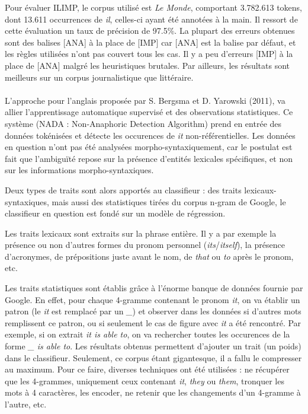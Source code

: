 \documentclass[a4paper,12pt]{article}
\begin{document}
Pour évaluer ILIMP, le corpus utilisé est \emph{Le Monde}, comportant 3.782.613 tokens, dont 13.611 occurrences de \og{}\textit{il}\fg{}, celles-ci ayant été annotées à la main. Il ressort de cette évaluation un taux de précision de 97.5\%. La plupart des erreurs obtenues sont des balises [ANA] à la place de [IMP] car [ANA] est la balise par défaut, et les règles utilisées n'ont pas couvert tous les cas. Il y a peu d'erreurs [IMP] à la place de [ANA] malgré les heuristiques brutales.
Par ailleurs, les résultats sont meilleurs sur un corpus journalistique que littéraire.


\paragraph{}
L'approche pour l'anglais proposée par S. Bergsma et D. Yarowski (2011), va allier l'apprentissage automatique supervisé et des observations statistiques.
Ce système (NADA : Non-Anaphoric Detection Algorithm) prend en entrée des données tokénisées et détecte les occurences de \og{}\textit{it}\fg{} non-référentielles. Les données en question n'ont pas été analysées morpho-syntaxiquement, car le postulat est fait que l'ambiguïté repose sur la présence d'entités lexicales spécifiques, et non sur les informations morpho-syntaxiques.

Deux types de traits sont alors apportés au classifieur : des traits lexicaux-syntaxiques, mais aussi des statistiques tirées du corpus n-gram de Google\cite{google-ngram}, le classifieur en question est fondé sur un modèle de régression.

Les traits lexicaux sont extraits sur la phrase entière. Il y a par exemple la présence ou non d'autres formes du pronom personnel (\textit{its}/\textit{itself}), la présence d'acronymes, de prépositions juste avant le nom, de \og{}\textit{that}\fg{} ou \og{}\textit{to}\fg{} après le pronom, etc.

Les traits statistiques sont établis grâce à l'énorme banque de données fournie par Google. En effet, pour chaque 4-gramme contenant le pronom \og{}\textit{it}\fg{}, on va établir un patron (le \og{}\textit{it}\fg{} est remplacé par un \og{}\textit{\_}\fg{}) et observer dans les données si d'autres mots remplissent ce patron, ou si seulement le cas de figure avec \og{}\textit{it}\fg{} a été rencontré. Par exemple, si on extrait \og{}\textit{it is able to}\fg{}, on va rechercher toutes les occurences de la forme \og{}\textit{\_ is able to}\fg{}.
Les résultats obtenus permettent d'ajouter un trait (un poids) dans le classifieur.
Seulement, ce corpus étant gigantesque, il a fallu le compresser au maximum. Pour ce faire, diverses techniques ont été utilisées : ne récupérer que les 4-grammes, uniquement ceux contenant \og{}\textit{it}\fg{}, \og{}\textit{they}\fg{} ou \og{}\textit{them}\fg{}, tronquer les mots à 4 caractères, les encoder, ne retenir que les changements d'un 4-gramme à l'autre, etc.
\end{document}
